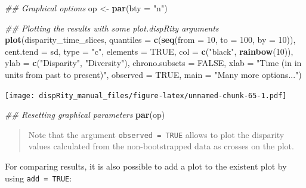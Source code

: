 \documentclass[]{book}
\newenvironment{Shaded}{\begin{snugshade}}{\end{snugshade}}
\newcommand{\CommentTok}[1]{\textcolor[rgb]{0.56,0.35,0.01}{\textit{#1}}}
\newcommand{\DataTypeTok}[1]{\textcolor[rgb]{0.13,0.29,0.53}{#1}}
\newcommand{\DecValTok}[1]{\textcolor[rgb]{0.00,0.00,0.81}{#1}}
\newcommand{\KeywordTok}[1]{\textcolor[rgb]{0.13,0.29,0.53}{\textbf{#1}}}
\newcommand{\NormalTok}[1]{#1}
\newcommand{\OtherTok}[1]{\textcolor[rgb]{0.56,0.35,0.01}{#1}}
\newcommand{\StringTok}[1]{\textcolor[rgb]{0.31,0.60,0.02}{#1}}
\begin{document}
\begin{Shaded}
\begin{Highlighting}[]
\CommentTok{## Graphical options}
\NormalTok{op <-}\StringTok{ }\KeywordTok{par}\NormalTok{(}\DataTypeTok{bty =} \StringTok{"n"}\NormalTok{)}

\CommentTok{## Plotting the results with some plot.dispRity arguments}
\KeywordTok{plot}\NormalTok{(disparity_time_slices,}
    \DataTypeTok{quantiles =} \KeywordTok{c}\NormalTok{(}\KeywordTok{seq}\NormalTok{(}\DataTypeTok{from =} \DecValTok{10}\NormalTok{, }\DataTypeTok{to =} \DecValTok{100}\NormalTok{, }\DataTypeTok{by =} \DecValTok{10}\NormalTok{)),}
    \DataTypeTok{cent.tend =}\NormalTok{ sd, }\DataTypeTok{type =} \StringTok{"c"}\NormalTok{, }\DataTypeTok{elements =} \OtherTok{TRUE}\NormalTok{,}
    \DataTypeTok{col =} \KeywordTok{c}\NormalTok{(}\StringTok{"black"}\NormalTok{, }\KeywordTok{rainbow}\NormalTok{(}\DecValTok{10}\NormalTok{)),}
    \DataTypeTok{ylab =} \KeywordTok{c}\NormalTok{(}\StringTok{"Disparity"}\NormalTok{, }\StringTok{"Diversity"}\NormalTok{), }\DataTypeTok{chrono.subsets =} \OtherTok{FALSE}\NormalTok{,}
    \DataTypeTok{xlab =} \StringTok{"Time (in in units from past to present)"}\NormalTok{,}
    \DataTypeTok{observed =} \OtherTok{TRUE}\NormalTok{,}
    \DataTypeTok{main =} \StringTok{"Many more options..."}\NormalTok{)}
\end{Highlighting}
\end{Shaded}

\texttt{[image: dispRity\_manual\_files/figure-latex/unnamed-chunk-65-1.pdf]}

\begin{Shaded}
\begin{Highlighting}[]
\CommentTok{## Resetting graphical parameters}
\KeywordTok{par}\NormalTok{(op)}
\end{Highlighting}
\end{Shaded}

\begin{quote}
Note that the argument \texttt{observed\ =\ TRUE} allows to plot the disparity values calculated from the non-bootstrapped data as crosses on the plot.
\end{quote}

For comparing results, it is also possible to add a plot to the existent plot by using \texttt{add\ =\ TRUE}:
\end{document}
